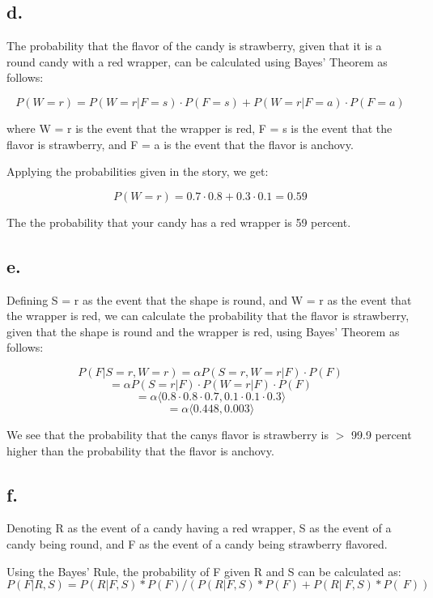 \documentclass{article}
\begin{document}
\subsection*{d.}

The probability that the flavor of the candy is strawberry, given that it is a round candy with a red wrapper, can be calculated using Bayes' Theorem as follows:

\[P(W = r) = P(W = r | F = s) \cdot P(F = s) + P(W = r | F = a) \cdot P(F = a)\]

where W = r is the event that the wrapper is red, F = s is the event that the flavor is strawberry, and F = a is the event that the flavor is anchovy.

Applying the probabilities given in the story, we get:

\[P(W = r) = 0.7 \cdot 0.8 + 0.3 \cdot 0.1 = 0.59\]

The the probability that your candy has a red wrapper is 59 percent.


\subsection*{e.}

Defining S = r as the event that the shape is round, and W = r as the event that the wrapper is red, we can calculate the probability that the flavor is strawberry, given that the shape is round and the wrapper is red, using Bayes' Theorem as follows:

\[P(F | S = r, W = r) = \alpha P(S = r, W = r | F) \cdot P(F)\]
\[= \alpha P(S = r | F) \cdot P(W = r | F) \cdot P(F)\]
\[= \alpha \langle 0.8 \cdot 0.8 \cdot 0.7, 0.1 \cdot 0.1 \cdot 0.3 \rangle \]
\[= \alpha \langle 0.448, 0.003 \rangle\]

We see that the probability that the canys flavor is strawberry is \(>\) 99.9 percent higher than the probability that the flavor is anchovy.

\subsection*{f.}

Denoting R as the event of a candy having a red wrapper, S as the event of a candy being round, and F as the event of a candy being strawberry flavored.

Using the Bayes' Rule, the probability of F given R and S can be calculated as:
\[P(F|R,S) = P(R|F,S) * P(F) / (P(R|F,S) * P(F) + P(R|~F,S) * P(~F))\]
\end{document}
